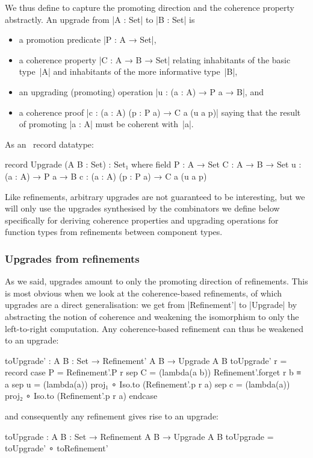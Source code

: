 We thus define  to capture the promoting direction and the coherence property abstractly.
An upgrade from |A : Set| to |B : Set| is
\begin{itemize}
\item a promotion predicate |P : A → Set|,
\item a coherence property |C : A → B → Set| relating inhabitants of the basic type~|A| and inhabitants of the more informative type~|B|,
\item an upgrading (promoting) operation |u : (a : A) → P a → B|, and
\item a coherence proof |c : (a : A) (p : P a) → C a (u a p)| saying that the result of promoting |a : A| must be coherent with~|a|.
\end{itemize}
As an \Agda\ record datatype:
\begin{code}
record Upgrade (A B : Set) : Set₁ where
  field
    P  :  A → Set
    C  :  A → B → Set
    u  :  (a : A) → P a → B
    c  :  (a : A) (p : P a) → C a (u a p)
\end{code}
Like refinements, arbitrary upgrades are not guaranteed to be interesting, but we will only use the upgrades synthesised by the combinators we define below specifically for deriving coherence properties and upgrading operations for function types from refinements between component types.

\subsubsection{Upgrades from refinements}

As we said, upgrades amount to only the promoting direction of refinements.
This is most obvious when we look at the coherence-based refinements, of which upgrades are a direct generalisation: we get from |Refinement'| to |Upgrade| by abstracting the notion of coherence and weakening the isomorphism to only the left-to-right computation.
Any coherence-based refinement can thus be weakened to an upgrade:
\begin{code}
toUpgrade' : {A B : Set} → Refinement' A B → Upgrade A B
toUpgrade' r = record  case  P  =  Refinement'.P r
                       sep   C  =  (lambda(a b)) Refinement'.forget r b ≡ a
                       sep   u  =  (lambda(a)) proj₁  ∘ Iso.to (Refinement'.p r a)
                       sep   c  =  (lambda(a)) proj₂  ∘ Iso.to (Refinement'.p r a) endcase
\end{code}
and consequently any refinement gives rise to an upgrade:
\begin{code}
toUpgrade : {A B : Set} → Refinement A B → Upgrade A B
toUpgrade = toUpgrade' ∘ toRefinement'
\end{code}

